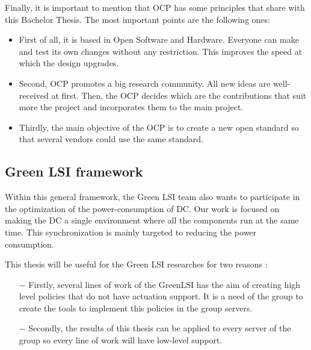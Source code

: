 Finally, it is important to mention that OCP has some principles that share with this Bachelor Thesis. The most important points are the following ones:

\begin{itemize}
    \item First of all, it is based in Open Software and Hardware. Everyone can make and test its own changes without any restriction. This improves the speed at which the design upgrades.
    \item Second, OCP promotes a big research community. All new ideas are well-received at first. Then, the OCP decides which are the contributions that suit more the project and incorporates them to the main project.
    \item Thirdly, the main objective of the OCP is to create a new open standard so that several vendors could use the same standard.
\end{itemize}

\subsection{Green LSI framework}

Within this general framework, the Green LSI team also wants to participate in the optimization of the power-consumption of DC. Our work is focused on making the DC a single environment where all the components run at the same time. This synchronization is mainly targeted to reducing the power consumption. 

This thesis will be useful for the Green LSI researches for two reasons
:
\begin{itemize}
\item[$-$] Firstly, several lines of work of the GreenLSI has the aim of creating high level policies that do not have actuation support. It is a need of the group to create the tools to implement this policies in the group servers.

\item[$-$] Secondly, the results of this thesis can be applied to every server of the group so every line of work will have low-level support.
\end{itemize}





